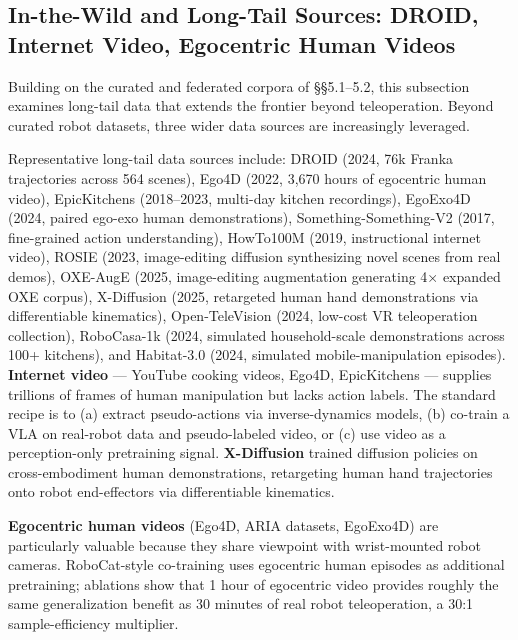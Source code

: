 \documentclass{article}
\begin{document}
\subsection{In-the-Wild and Long-Tail Sources: DROID, Internet Video, Egocentric Human Videos}\label{in-the-wild-and-long-tail-sources-droid-internet-video-egocentric-human-videos}

Building on the curated and federated corpora of §§5.1--5.2, this subsection examines long-tail data that extends the frontier beyond teleoperation. Beyond curated robot datasets, three wider data sources are increasingly leveraged.

Representative long-tail data sources include: DROID (2024, 76k Franka trajectories across 564 scenes), Ego4D (2022, 3,670 hours of egocentric human video), EpicKitchens (2018--2023, multi-day kitchen recordings), EgoExo4D (2024, paired ego-exo human demonstrations), Something-Something-V2 (2017, fine-grained action understanding), HowTo100M (2019, instructional internet video), ROSIE (2023, image-editing diffusion synthesizing novel scenes from real demos), OXE-AugE (2025, image-editing augmentation generating 4× expanded OXE corpus), X-Diffusion (2025, retargeted human hand demonstrations via differentiable kinematics), Open-TeleVision (2024, low-cost VR teleoperation collection), RoboCasa-1k (2024, simulated household-scale demonstrations across 100+ kitchens), and Habitat-3.0 (2024, simulated mobile-manipulation episodes). \textbf{Internet video} \cite{mccarthy2025towardsgeneralistr} --- YouTube cooking videos, Ego4D, EpicKitchens --- supplies trillions of frames of human manipulation but lacks action labels. The standard recipe is to (a) extract pseudo-actions via inverse-dynamics models, (b) co-train a VLA on real-robot data and pseudo-labeled video, or (c) use video as a perception-only pretraining signal. \textbf{X-Diffusion} \cite{pace2025xdiffusiontraining} trained diffusion policies on cross-embodiment human demonstrations, retargeting human hand trajectories onto robot end-effectors via differentiable kinematics.

\textbf{Egocentric human videos} (Ego4D, ARIA datasets, EgoExo4D) are particularly valuable because they share viewpoint with wrist-mounted robot cameras. RoboCat-style co-training uses egocentric human episodes as additional pretraining; ablations show that 1 hour of egocentric video provides roughly the same generalization benefit as 30 minutes of real robot teleoperation, a 30:1 sample-efficiency multiplier.
\end{document}
